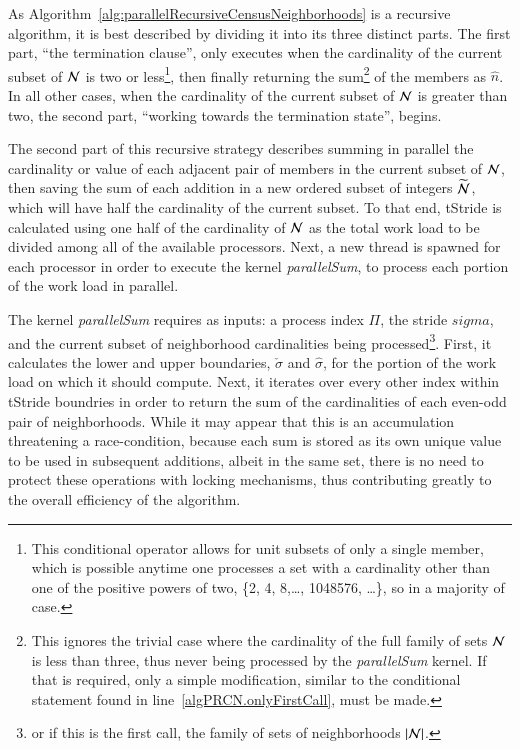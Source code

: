 As Algorithm~\ref{alg:parallelRecursiveCensusNeighborhoods} is a recursive algorithm, it is best described by dividing it into its three distinct parts. The first part, ``the termination clause'', only executes when the cardinality of the current subset of $\mathcal{N}$ is two or less\footnote{This conditional operator allows for unit subsets of only a single member, which is possible anytime one processes a set with a cardinality other than one of the positive powers of two, \{2, 4, 8,\ldots , 1048576, \ldots\}, so in a majority of case.}, then finally returning the sum\footnote{This ignores the trivial case where the cardinality of the full family of sets $\mathcal{N}$ is less than three, thus never being processed by the \textit{parallelSum} kernel. If that is required, only a simple modification, similar to the conditional statement found in line~\ref{algPRCN.onlyFirstCall}, must be made.} of the members as $\hat{n}$. In all other cases, when the cardinality of the current subset of $\mathcal{N}$ is greater than two, the second part, ``working towards the termination state'', begins.

The second part of this recursive strategy describes summing in parallel the cardinality or value of each adjacent pair of members in the current subset of $\mathcal{N}$, then saving the sum of each addition in a new ordered subset of integers $\widetilde{\mathcal{N}}$, which will have half the cardinality of the current subset. To that end, \gls{tStride} is calculated using one half of the cardinality of $\mathcal{N}$ as the total work load to be divided among all of the available processors. Next, a new thread is spawned for each processor in order to execute the kernel \textit{parallelSum}, to process each portion of the work load in parallel.

The kernel \textit{parallelSum} requires as inputs: a process index $\Pi$, the stride $sigma$, and the current subset of neighborhood cardinalities being processed\footnote{or if this is the first call, the family of sets of neighborhoods $|\mathcal{N}|$.}. First, it calculates the lower and upper boundaries, $\check{\sigma}$ and $\hat{\sigma}$, for the portion of the work load on which it should compute. Next, it iterates over every other index within \gls{tStride} boundries in order to return the sum of the cardinalities of each even-odd pair of neighborhoods. While it may appear that this is an accumulation threatening a race-condition, because each sum is stored as its own unique value to be used in subsequent additions, albeit in the same set, there is no need to protect these operations with locking mechanisms, thus contributing greatly to the overall efficiency of the algorithm.

